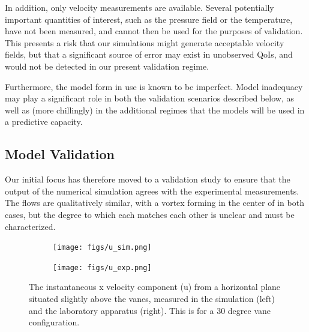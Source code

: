 In addition, only velocity measurements are available. Several
potentially important quantities of interest, such as the pressure field
or the temperature, have not been measured, and cannot then be used for
the purposes of validation. This presents a risk that our 
simulations might generate acceptable velocity fields, but that a
significant source of error may exist in unobserved QoIs, and would not
be detected in our present validation regime. 

Furthermore, the model form in use is known to be imperfect. 
Model inadequacy may play a significant role in both the validation
scenarios described below, as well as (more chillingly) in the
additional regimes that the models will be used in a predictive
capacity. 

\subsection{Model Validation}
Our initial focus has therefore moved to a validation study to ensure that the
output of the numerical simulation agrees with the experimental
measurements. The flows are qualitatively similar, with a vortex forming
in the center of in both cases, but the degree to which each matches
each other is unclear and must be characterized. 

\begin{figure}[!htb]
        \centering
        \begin{subfigure}[bh]{0.5\textwidth}
                \texttt{[image: figs/u\_sim.png]}
        \end{subfigure}%
        \begin{subfigure}[bh]{0.5\textwidth}
                \texttt{[image: figs/u\_exp.png]}
        \end{subfigure}
 \caption{The instantaneous x velocity component (u)
 from a horizontal plane situated slightly above the vanes,
 measured in the simulation (left) and the laboratory apparatus
 (right). This is for a 30 degree vane configuration.} 
 \label{fig:instant}
\end{figure}


